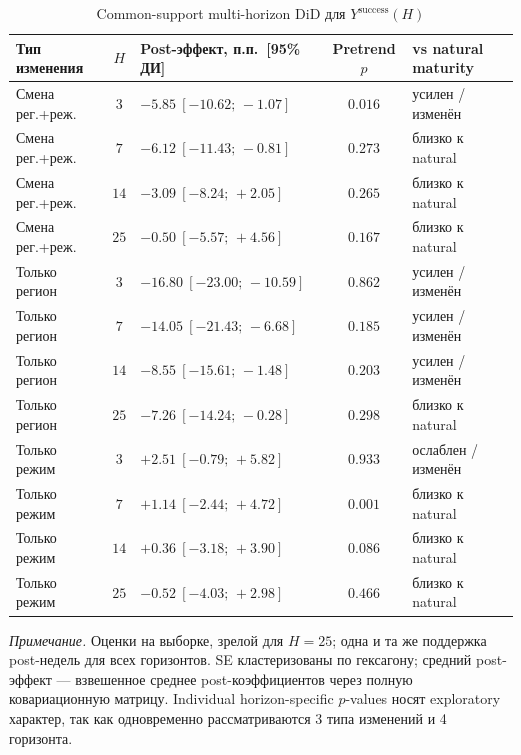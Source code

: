 \documentclass[14pt,a4paper]{extarticle}
\begin{document}
\begin{table}[H]
\centering
\caption{Common-support multi-horizon DiD для \(Y^{\mathrm{success}}(H)\)}
\label{tab:success_timing_common}
\footnotesize
\setlength{\tabcolsep}{2.5pt}
\renewcommand{\arraystretch}{1.12}
\begin{tabularx}{\textwidth}{@{}l c >{\centering\arraybackslash}X c >{\raggedright\arraybackslash}X@{}}
\toprule
Тип изменения & \(H\) & Post-эффект, п.п.\ [95\% ДИ] & Pretrend \(p\) & vs natural maturity \\
\midrule
Смена рег.+реж. & $3$ & $-5.85\ [-10.62;\,-1.07]$ & $0.016$ & усилен / изменён \\
Смена рег.+реж. & $7$ & $-6.12\ [-11.43;\,-0.81]$ & $0.273$ & близко к natural \\
Смена рег.+реж. & $14$ & $-3.09\ [-8.24;\,+2.05]$ & $0.265$ & близко к natural \\
Смена рег.+реж. & $25$ & $-0.50\ [-5.57;\,+4.56]$ & $0.167$ & близко к natural \\
Только регион & $3$ & $-16.80\ [-23.00;\,-10.59]$ & $0.862$ & усилен / изменён \\
Только регион & $7$ & $-14.05\ [-21.43;\,-6.68]$ & $0.185$ & усилен / изменён \\
Только регион & $14$ & $-8.55\ [-15.61;\,-1.48]$ & $0.203$ & усилен / изменён \\
Только регион & $25$ & $-7.26\ [-14.24;\,-0.28]$ & $0.298$ & близко к natural \\
Только режим & $3$ & $+2.51\ [-0.79;\,+5.82]$ & $0.933$ & ослаблен / изменён \\
Только режим & $7$ & $+1.14\ [-2.44;\,+4.72]$ & $0.001$ & близко к natural \\
Только режим & $14$ & $+0.36\ [-3.18;\,+3.90]$ & $0.086$ & близко к natural \\
Только режим & $25$ & $-0.52\ [-4.03;\,+2.98]$ & $0.466$ & близко к natural \\
\bottomrule
\end{tabularx}
\begin{minipage}{0.98\textwidth}
\scriptsize
\textit{Примечание.} Оценки на выборке, зрелой для \(H=25\); одна и та же
поддержка post-недель для всех горизонтов. SE кластеризованы по гексагону;
средний post-эффект --- взвешенное среднее post-коэффициентов через полную
ковариационную матрицу. Individual horizon-specific \(p\)-values носят
exploratory характер, так как одновременно рассматриваются 3 типа изменений
и 4 горизонта.
\end{minipage}
\end{table}
\end{document}
